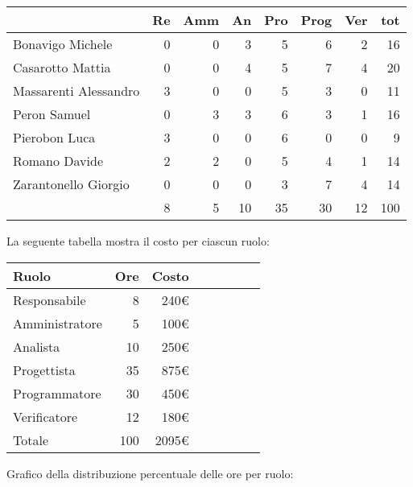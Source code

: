 \begin{table}[ht]
    \begin{tabularx}{\linewidth}{X|rrrrrrr}
    \rowcolor{gray!30}& Re & Amm & An & Pro & Prog & Ver & tot \\
    \hline
    Bonavigo Michele                        & 0 & 0 & 3 & 5 & 6 & 2 & 16 \\
    \rowcolor{gray!10}Casarotto Mattia      & 0 & 0 & 4 & 5 & 7 & 4 & 20 \\
    Massarenti Alessandro                   & 3 & 0 & 0 & 5 & 3 & 0 & 11 \\
    \rowcolor{gray!10}Peron Samuel          & 0 & 3 & 3 & 6 & 3 & 1 & 16 \\
    Pierobon Luca                           & 3 & 0 & 0 & 6 & 0 & 0 & 9  \\
    \rowcolor{gray!10}Romano Davide         & 2 & 2 & 0 & 5 & 4 & 1 & 14 \\
    Zarantonello Giorgio                    & 0 & 0 & 0 & 3 & 7 & 4 & 14 \\
    \hline                                  & 8 & 5 & 10 & 35 & 30 & 12 & 100 \\ 
    \end{tabularx}
\end{table}

La seguente tabella mostra il costo per ciascun ruolo:
\begin{table}[ht]
    \begin{tabularx}{\linewidth}{X|rrrrrrr}
    \rowcolor{gray!30}Ruolo & Ore & Costo \\
    \hline
    Responsabile                            & 8 & 240€ \\
    \rowcolor{gray!10}Amministratore        & 5 & 100€ \\
    Analista                                & 10 & 250€ \\
    \rowcolor{gray!10}Progettista           & 35 & 875€ \\
    Programmatore                           & 30 & 450€ \\
    \rowcolor{gray!10}Verificatore          & 12 & 180€ \\
    \hline Totale                           & 100 & 2095€ \\ 
    \end{tabularx}
\end{table}

Grafico della distribuzione percentuale delle ore per ruolo:
\begin{center}
\end{center}

